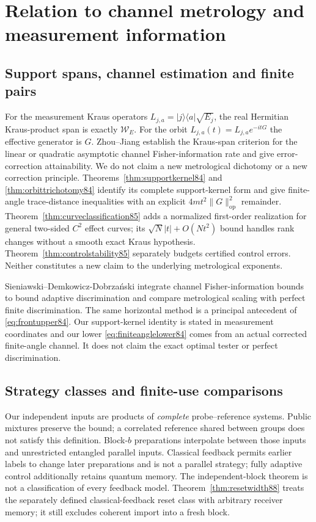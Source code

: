 \section{Relation to channel metrology and measurement information}
\label{sec:comparison84}

\subsection{Support spans, channel estimation and finite pairs}
For the measurement Kraus operators
$L_{j,a}=|j\rangle\langle a|\sqrt{E_j}$, the real Hermitian
Kraus-product span is exactly $\mathcal W_E$.  For the orbit
$L_{j,a}(t)=L_{j,a}e^{-itG}$ the effective generator is $G$.
Zhou--Jiang \cite[Theorems~1--3 and Section~V]{ZJ84} establish the
Kraus-span criterion for the linear or quadratic asymptotic channel
Fisher-information rate and give error-correction attainability.
We do not claim a new metrological dichotomy or a new correction
principle.  Theorems~\ref{thm:supportkernel84} and
\ref{thm:orbittrichotomy84} identify its complete support-kernel
form and give finite-angle trace-distance inequalities with an
explicit $4mt^2\|G\|_{\mathrm{op}}^2$ remainder.
Theorem~\ref{thm:curveclassification85} adds a normalized first-order
realization for general two-sided $C^2$ effect curves; its
$\sqrt N|t|+O(Nt^2)$ bound handles rank changes without a smooth
exact Kraus hypothesis.  Theorem~\ref{thm:controlstability85} separately
budgets certified control errors.  Neither constitutes a new claim
to the underlying metrological exponents.

Sieniawski--Demkowicz-Dobrza\'nski
\cite[Section~IV, equations~(16)--(23)]{SD76} integrate channel
Fisher-information bounds to bound adaptive discrimination and
compare metrological scaling with perfect finite discrimination.
The same horizontal method is a principal antecedent of
\eqref{eq:frontupper84}.  Our support-kernel identity is stated in
measurement coordinates and our lower \eqref{eq:finiteanglelower84}
comes from an actual corrected finite-angle channel.  It does not
claim the exact optimal tester or perfect discrimination.


\subsection{Strategy classes and finite-use comparisons}
Our independent inputs are products of \emph{complete} probe--reference
systems.  Public mixtures preserve the bound; a correlated reference
shared between groups does not satisfy this definition.  Block-$b$
preparations interpolate between those inputs and unrestricted
entangled parallel inputs.  Classical feedback permits earlier
labels to change later preparations and is not a parallel strategy;
fully adaptive control additionally retains quantum memory.  The
independent-block theorem is not a classification of every feedback
model.  Theorem~\ref{thm:resetwidth88} treats the separately defined
classical-feedback reset class with arbitrary receiver memory; it
still excludes coherent import into a fresh block.

